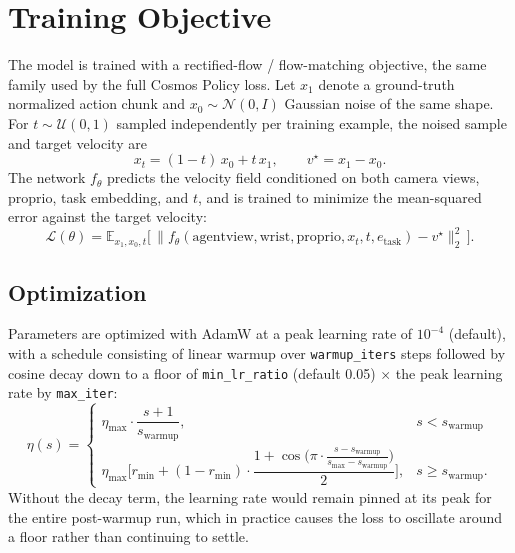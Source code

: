 \documentclass[11pt]{article}
\begin{document}
\section{Training Objective}

The model is trained with a rectified-flow / flow-matching objective, the same family used by
the full Cosmos Policy loss. Let $x_1$ denote a ground-truth normalized action chunk and
$x_0 \sim \mathcal{N}(0, I)$ Gaussian noise of the same shape. For $t \sim \mathcal{U}(0, 1)$
sampled independently per training example, the noised sample and target velocity are
\begin{equation}
    x_t = (1 - t)\, x_0 + t\, x_1, \qquad v^{\star} = x_1 - x_0.
\end{equation}
The network $f_\theta$ predicts the velocity field conditioned on both camera views, proprio,
task embedding, and $t$, and is trained to minimize the mean-squared error against the target
velocity:
\begin{equation}
    \mathcal{L}(\theta) = \mathbb{E}_{x_1, x_0, t}
    \Big[\, \big\| f_\theta(\text{agentview}, \text{wrist}, \text{proprio}, x_t, t, e_{\text{task}}) - v^{\star} \big\|_2^2 \,\Big].
\end{equation}

\subsection{Optimization}

Parameters are optimized with AdamW at a peak learning rate of $10^{-4}$ (default), with a
schedule consisting of linear warmup over \texttt{warmup\_iters} steps followed by cosine decay
down to a floor of \texttt{min\_lr\_ratio} (default 0.05) $\times$ the peak learning rate by
\texttt{max\_iter}:
\begin{equation}
    \eta(s) =
    \begin{cases}
        \eta_{\max} \cdot \dfrac{s+1}{s_{\text{warmup}}}, & s < s_{\text{warmup}} \\[1.2em]
        \eta_{\max} \Big[ r_{\min} + (1 - r_{\min}) \cdot
            \dfrac{1 + \cos\!\big(\pi \cdot \frac{s - s_{\text{warmup}}}{s_{\max} - s_{\text{warmup}}}\big)}{2} \Big],
        & s \geq s_{\text{warmup}}.
    \end{cases}
\end{equation}
Without the decay term, the learning rate would remain pinned at its peak for the entire
post-warmup run, which in practice causes the loss to oscillate around a floor rather than
continuing to settle.
\end{document}
